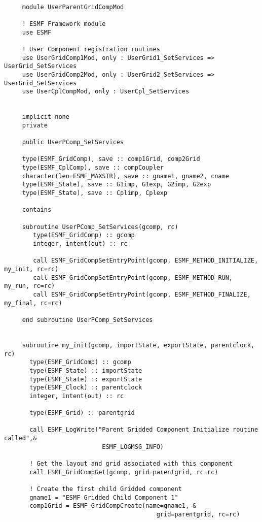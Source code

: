   
  \begin{verbatim}
 
     module UserParentGridCompMod
     
     ! ESMF Framework module
     use ESMF
     
     ! User Component registration routines
     use UserGridComp1Mod, only : UserGrid1_SetServices => UserGrid_SetServices
     use UserGridComp2Mod, only : UserGrid2_SetServices => UserGrid_SetServices
     use UserCplCompMod, only : UserCpl_SetServices
 
 
     implicit none
     private
     
     public UserPComp_SetServices
 
     type(ESMF_GridComp), save :: comp1Grid, comp2Grid
     type(ESMF_CplComp), save :: compCoupler
     character(len=ESMF_MAXSTR), save :: gname1, gname2, cname
     type(ESMF_State), save :: G1imp, G1exp, G2imp, G2exp
     type(ESMF_State), save :: Cplimp, Cplexp
 
     contains
 
     subroutine UserPComp_SetServices(gcomp, rc)
        type(ESMF_GridComp) :: gcomp
        integer, intent(out) :: rc
 
        call ESMF_GridCompSetEntryPoint(gcomp, ESMF_METHOD_INITIALIZE, my_init, rc=rc)
        call ESMF_GridCompSetEntryPoint(gcomp, ESMF_METHOD_RUN, my_run, rc=rc)
        call ESMF_GridCompSetEntryPoint(gcomp, ESMF_METHOD_FINALIZE, my_final, rc=rc)
 
     end subroutine UserPComp_SetServices
 
 
     subroutine my_init(gcomp, importState, exportState, parentclock, rc)
       type(ESMF_GridComp) :: gcomp
       type(ESMF_State) :: importState
       type(ESMF_State) :: exportState
       type(ESMF_Clock) :: parentclock
       integer, intent(out) :: rc
      
       type(ESMF_Grid) :: parentgrid
 
       call ESMF_LogWrite("Parent Gridded Component Initialize routine called",&
                           ESMF_LOGMSG_INFO)
 
       ! Get the layout and grid associated with this component
       call ESMF_GridCompGet(gcomp, grid=parentgrid, rc=rc)
 
       ! Create the first child Gridded component
       gname1 = "ESMF Gridded Child Component 1"
       comp1Grid = ESMF_GridCompCreate(name=gname1, & 
                                          grid=parentgrid, rc=rc)
 

\end{verbatim}
